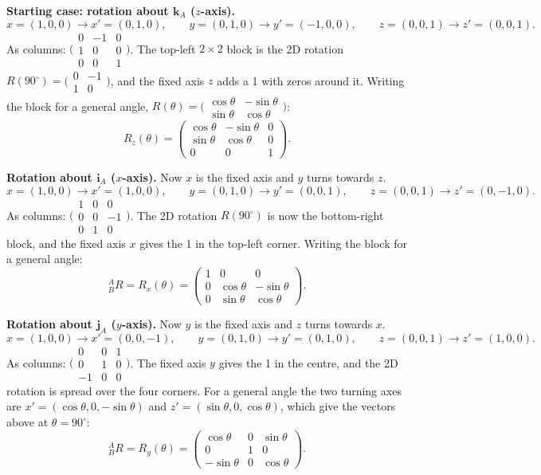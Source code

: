 \documentclass[11pt,a4paper]{article}
\newcommand{\rot}{{}^{A}_{B}R}
\begin{document}
\textbf{Starting case: rotation about $\mathbf{k}_A$ ($z$-axis).}
\[
x = (1,0,0) \to x' = (0,1,0), \qquad
y = (0,1,0) \to y' = (-1,0,0), \qquad
z = (0,0,1) \to z' = (0,0,1).
\]
As columns: $\bigl(\begin{smallmatrix} 0 & -1 & 0 \\ 1 & 0 & 0 \\ 0 & 0 & 1 \end{smallmatrix}\bigr)$.
The top-left $2\times2$ block is the 2D rotation $R(90^\circ) = \bigl(\begin{smallmatrix} 0 & -1 \\ 1 & 0 \end{smallmatrix}\bigr)$, and the fixed axis $z$ adds a 1 with zeros around it. Writing the block for a general angle, $R(\theta) = \bigl(\begin{smallmatrix} \cos\theta & -\sin\theta \\ \sin\theta & \cos\theta \end{smallmatrix}\bigr)$:
\[
R_z(\theta) = \begin{pmatrix} \cos\theta & -\sin\theta & 0 \\ \sin\theta & \cos\theta & 0 \\ 0 & 0 & 1 \end{pmatrix}.
\]

\textbf{Rotation about $\mathbf{i}_A$ ($x$-axis).} Now $x$ is the fixed axis and $y$ turns towards $z$.
\[
x = (1,0,0) \to x' = (1,0,0), \qquad
y = (0,1,0) \to y' = (0,0,1), \qquad
z = (0,0,1) \to z' = (0,-1,0).
\]
As columns: $\bigl(\begin{smallmatrix} 1 & 0 & 0 \\ 0 & 0 & -1 \\ 0 & 1 & 0 \end{smallmatrix}\bigr)$.
The 2D rotation $R(90^\circ)$ is now the bottom-right block, and the fixed axis $x$ gives the 1 in the top-left corner. Writing the block for a general angle:
\[
\rot = R_x(\theta) = \begin{pmatrix} 1 & 0 & 0 \\ 0 & \cos\theta & -\sin\theta \\ 0 & \sin\theta & \cos\theta \end{pmatrix}.
\]

\textbf{Rotation about $\mathbf{j}_A$ ($y$-axis).} Now $y$ is the fixed axis and $z$ turns towards $x$.
\[
x = (1,0,0) \to x' = (0,0,-1), \qquad
y = (0,1,0) \to y' = (0,1,0), \qquad
z = (0,0,1) \to z' = (1,0,0).
\]
As columns: $\bigl(\begin{smallmatrix} 0 & 0 & 1 \\ 0 & 1 & 0 \\ -1 & 0 & 0 \end{smallmatrix}\bigr)$.
The fixed axis $y$ gives the 1 in the centre, and the 2D rotation is spread over the four corners. For a general angle the two turning axes are $x' = (\cos\theta, 0, -\sin\theta)$ and $z' = (\sin\theta, 0, \cos\theta)$, which give the vectors above at $\theta = 90^\circ$:
\[
\rot = R_y(\theta) = \begin{pmatrix} \cos\theta & 0 & \sin\theta \\ 0 & 1 & 0 \\ -\sin\theta & 0 & \cos\theta \end{pmatrix}.
\]
\end{document}

